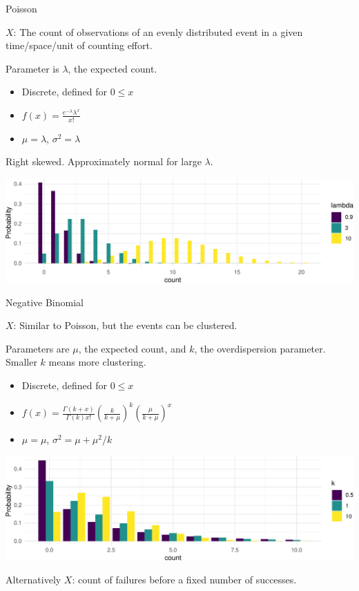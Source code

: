 \documentclass[
  ignorenonframetext,
]{beamer}
\providecommand{\tightlist}{%
  \setlength{\itemsep}{0pt}\setlength{\parskip}{0pt}}
\begin{document}
\begin{frame}{Poisson}
\protect\hypertarget{poisson}{}

\(X\): The count of observations of an evenly distributed event in a
given time/space/unit of counting effort.

Parameter is \(\lambda\), the expected count.

\begin{itemize}
\tightlist
\item
  Discrete, defined for \(0\leq x\)
\item
  \(\displaystyle f(x)=\frac{e^{-\lambda}\lambda^x}{x!}\)
\item
  \(\mu=\lambda\), \(\sigma^2=\lambda\)
\end{itemize}

Right skewed. Approximately normal for large \(\lambda\).

\includegraphics{noise_files/figure-beamer/unnamed-chunk-5-1.pdf}

\end{frame}

\begin{frame}{Negative Binomial}
\protect\hypertarget{negative-binomial}{}

\(X\): Similar to Poisson, but the events can be clustered.

Parameters are \(\mu\), the expected count, and \(k\), the
overdispersion parameter. Smaller \(k\) means more clustering.

\begin{itemize}
\tightlist
\item
  Discrete, defined for \(0\leq x\)
\item
  \(\displaystyle f(x)=\frac{\Gamma(k+x)}{\Gamma(k)x!}\left(\frac{k}{k+\mu}\right)^k\left(\frac{\mu}{k+\mu}\right)^x\)
\item
  \(\mu=\mu\), \(\sigma^2=\mu+\mu^2/k\)
\end{itemize}

\includegraphics{noise_files/figure-beamer/unnamed-chunk-6-1.pdf}

Alternatively \(X\): count of failures before a fixed number of
successes.

\end{frame}
\end{document}
